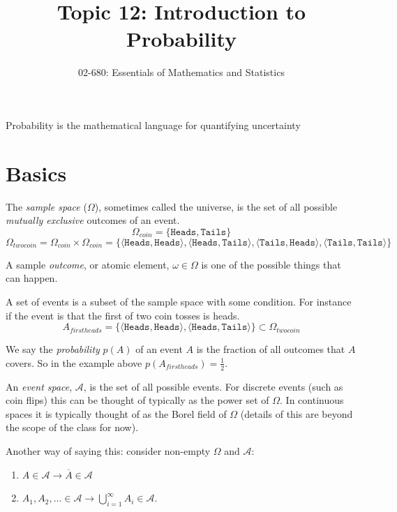 


\title{Topic 12: Introduction to Probability}
\author{02-680: Essentials of Mathematics and Statistics}


\maketitle

\begin{center}
Probability is the mathematical language for quantifying uncertainty
\end{center} 

\section{Basics}
The \emph{sample space} ($\Omega$), sometimes called the universe, is the set of all possible 
\textit{mutually exclusive} outcomes of an event. 
\[\Omega_{coin}=\{\texttt{Heads},\texttt{Tails}\}\]
\[\Omega_{twocoin}=\Omega_{coin}\times\Omega_{coin}=\{
\langle\texttt{Heads},\texttt{Heads}\rangle,
\langle\texttt{Heads},\texttt{Tails}\rangle,
\langle\texttt{Tails},\texttt{Heads}\rangle,
\langle\texttt{Tails},\texttt{Tails}\rangle\}\]

A sample \emph{outcome}, or atomic element, $\omega\in\Omega$ is one of the possible things that can happen. 

A set of events is a subset of the sample space with some condition. 
For instance if the event is that the first of two coin tosses is heads. 
\[A_{firstheads}=\{
\langle\texttt{Heads},\texttt{Heads}\rangle,
\langle\texttt{Heads},\texttt{Tails}\rangle\} \subset \Omega_{twocoin} \]

We say the \emph{probability} $p(A)$ of an event $A$ is the fraction of all outcomes that $A$ covers. 
So in the example above $p(A_{firstheads})=\frac{1}{2}$.

An \emph{event space}, $\mathcal{A}$, is the set of all possible events. 
For discrete events (such as coin flips) this can be thought of typically as the power set of $\Omega$. 
In continuous spaces it is typically thought of as the Borel field of $\Omega$ (details of this are beyond the scope of the class for now). 

Another way of saying this: 
consider non-empty $\Omega$ and $\mathcal{A}$:
\begin{enumerate}
\item $A\in\mathcal{A} \rightarrow \overline{A}\in\mathcal{A}$
\item $A_1,A_2,... \in \mathcal{A} \rightarrow \bigcup_{i=1}^\infty A_i \in \mathcal{A}$.
\end{enumerate}

